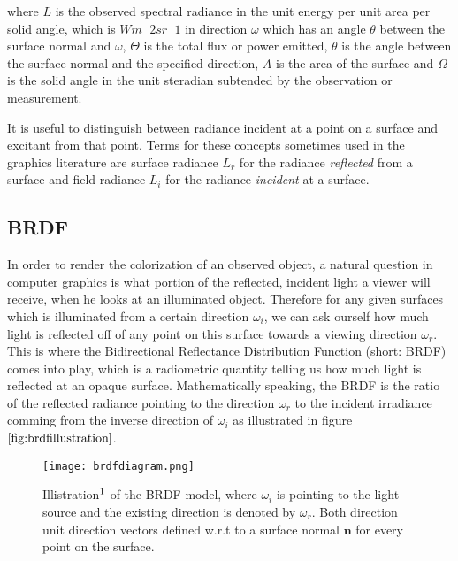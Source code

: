 where $L$ is the observed spectral radiance in the unit energy per unit area per solid angle, which is $Wm^-2 sr^-1$ in direction $\omega$ which has an angle $\theta$ between the surface normal and $\omega$, $\Theta$ is the total flux or power emitted, $\theta$ is the angle between the surface normal and the specified direction, $A$ is the area of the surface and $\Omega$ is the solid angle in the unit steradian subtended by the observation or measurement.

It is useful to distinguish between radiance incident at a point on a surface and excitant from that point. Terms for these concepts sometimes used in the graphics literature are surface radiance $L_r$ for the radiance \textit{reflected} from a surface and field radiance $L_i$ for the radiance \textit{incident} at a surface.  

\subsection{BRDF}
In order to render the colorization of an observed object, a natural question in computer graphics is what portion of the reflected, incident light a viewer will receive, when he looks at an illuminated object. Therefore for any given surfaces which is illuminated from a certain direction $\omega_i$, we can ask ourself how much light is reflected off of any point on this surface towards a viewing direction $\omega_r$. This is where the Bidirectional Reflectance Distribution Function (short: BRDF) comes into play, which is a radiometric quantity telling us how much light is reflected at an opaque surface. Mathematically speaking, the BRDF is the ratio of the reflected radiance pointing to the direction $\omega_r$ to the incident irradiance comming from the inverse direction of $\omega_i$ as illustrated in figure $\ref{fig:brdfillustration}$. 

\begin{figure}[ht]
  \centering
  \texttt{[image: brdfdiagram.png]}
  \caption[brdfillustration]{Illistration$\footnotemark$ of the BRDF model, where $\omega_i$ is pointing to the light source and the existing direction is denoted by $\omega_r$. Both direction unit direction vectors defined w.r.t to a surface normal $\mathbf{n}$ for every point on the surface.}
  \label{fig:brdfillustration}  
\end{figure}

